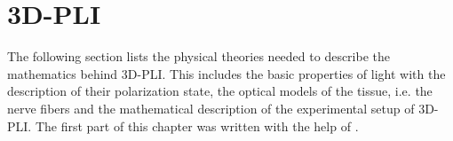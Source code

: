 \setcounter{chapter}{2}
\chapter{3D-PLI}
\label{sec:theory}
%
%
The following section lists the physical theories needed to describe the mathematics behind \ac{3D-PLI}. This includes the basic properties of light with the description of their polarization state, the optical models of the tissue, i.e. the nerve fibers and the mathematical description of the experimental setup of \ac{3D-PLI}. The first part of this chapter was written with the help of \cite{demtroeder2, Fliebach2012}.
% 
% 
% 
